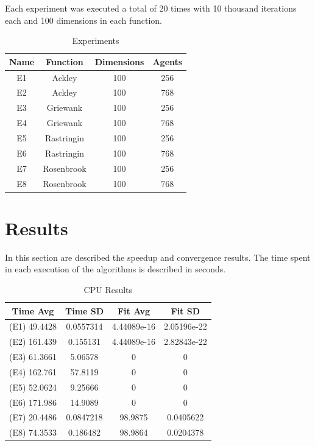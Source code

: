 \documentclass[conference]{IEEEtran}
\begin{document}
Each experiment was executed a total of 20 times with 10 thousand
iterations each and 100 dimensions in each function.

\begin{table}[!htbp]
    \renewcommand{\arraystretch}{1.3}
    \caption{Experiments}
    \label{experiments}
    \centering
    \begin{tabular}{c|c|c|c}
    \hline
        \bf Name & Function &  Dimensions & Agents\\
    \hline
        E1 & Ackley & 100 & 256\\
        E2 & Ackley & 100 & 768\\
        E3 & Griewank & 100 & 256\\
        E4 & Griewank & 100 & 768\\
        E5 & Rastringin & 100 & 256\\
        E6 & Rastringin & 100 & 768\\
        E7 & Rosenbrook & 100 & 256\\
        E8 & Rosenbrook & 100 & 768\\
    \end{tabular}
\end{table}

\section{Results}

In this section are described the speedup and convergence results. The
time spent in each execution of the algorithms is described in seconds.

\begin{table}[!t]
    \renewcommand{\arraystretch}{1.3}
    \caption{CPU Results}
    \label{results}
    \centering
    \begin{tabular}{c|c|c|c}
    \hline
        Time Avg & Time SD & Fit Avg & Fit SD\\
    \hline
        (E1) 49.4428 & 0.0557314 & 4.44089e-16 & 2.05196e-22 \\
        (E2) 161.439 & 0.155131 & 4.44089e-16 & 2.82843e-22 \\
        (E3) 61.3661 & 5.06578   & 0  & 0 \\
        (E4) 162.761 & 57.8119 & 0 & 0 \\
        (E5) 52.0624 & 9.25666   & 0  & 0 \\
        (E6) 171.986 & 14.9089 & 0 & 0 \\
        (E7) 20.4486 & 0.0847218 & 98.9875 & 0.0405622 \\
        (E8) 74.3533 & 0.186482 & 98.9864 & 0.0204378 \\
    \end{tabular}
\end{table}
\end{document}
